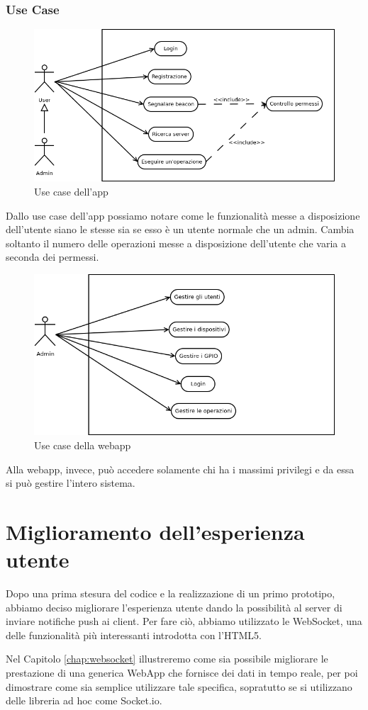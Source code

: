 \subsubsection{Use Case}
\begin{figure}[h]
\centering
\includegraphics[width=1\textwidth]{Immagini/usecaseApp.png} 
\caption{Use case dell'app}
\end{figure}

Dallo use case dell'app possiamo notare come le funzionalità messe a disposizione dell'utente siano le stesse sia se esso è un utente normale che un admin.
Cambia soltanto il numero delle operazioni messe a disposizione dell'utente che varia a seconda dei permessi.

\begin{figure}[h]
\centering
\includegraphics[width=1\textwidth]{Immagini/usecaseWebApp.png} 
\caption{Use case della webapp}
\end{figure}

Alla webapp, invece, può accedere solamente chi ha i massimi privilegi e da essa si può gestire l'intero sistema.
\section{Miglioramento dell'esperienza utente}
Dopo una prima stesura del codice e la realizzazione di un primo prototipo,
abbiamo deciso migliorare l'esperienza utente dando la possibilità al server di inviare notifiche push ai client.
Per fare ciò, abbiamo utilizzato le WebSocket, una delle funzionalità più interessanti introdotta con l'HTML5.

Nel Capitolo \ref{chap:websocket} illustreremo come sia possibile migliorare le  prestazione di una generica WebApp che fornisce dei dati in tempo reale, per poi dimostrare come sia semplice utilizzare tale specifica, sopratutto se si utilizzano delle libreria ad hoc come Socket.io. 